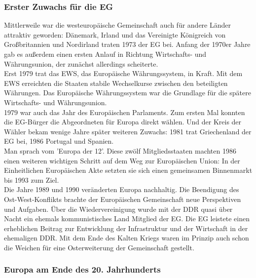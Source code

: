 \documentclass[letterpaper, 12pt]{article}
\let\tempsubsubsection\subsubsection
\renewcommand\subsubsection[1]{\vspace{0cm}\tempsubsubsection{#1}\vspace{0cm}}
\begin{document}
\subsubsection{Erster Zuwachs für die EG}

Mittlerweile war die westeuropäische Gemeinschaft auch für andere Länder attraktiv geworden: Dänemark, Irland und das Vereinigte Königreich von Großbritannien und Nordirland traten 1973 der EG bei. Anfang der 1970er Jahre gab es außerdem einen ersten Anlauf in Richtung Wirtschafts- und Währungsunion, der zunächst allerdings scheiterte. \\
Erst 1979 trat das EWS, das Europäische Währungssystem, in Kraft. Mit dem EWS erreichten die Staaten stabile Wechselkurse zwischen den beteiligten Währungen. Das Europäische Währungssystem war die Grundlage für die spätere Wirtschafts- und Währungsunion. \\
1979 war auch das Jahr des Europäischen Parlaments. Zum ersten Mal konnten die EG-Bürger die Abgeordneten für Europa direkt wählen. Und der Kreis der Wähler bekam wenige Jahre später weiteren Zuwachs: 1981 trat Griechenland der EG bei, 1986 Portugal und Spanien. \\
Man sprach vom 'Europa der 12'. Diese zwölf Mitgliedsstaaten machten 1986 einen weiteren wichtigen Schritt auf dem Weg zur Europäischen Union: In der Einheitlichen Europäischen Akte setzten sie sich einen gemeinsamen Binnenmarkt bis 1993 zum Ziel. \\
Die Jahre 1989 und 1990 veränderten Europa nachhaltig. Die Beendigung des Ost-West-Konflikts brachte der Europäischen Gemeinschaft neue Perspektiven und Aufgaben. Über die Wiedervereinigung wurde mit der DDR quasi über Nacht ein ehemals kommunistisches Land Mitglied der EG. Die EG leistete einen erheblichen Beitrag zur Entwicklung der Infrastruktur und der Wirtschaft in der ehemaligen DDR. Mit dem Ende des Kalten Kriegs waren im Prinzip auch schon die Weichen für eine Osterweiterung der Gemeinschaft gestellt. \\

\subsubsection{Europa am Ende des 20. Jahrhunderts}
\end{document}
